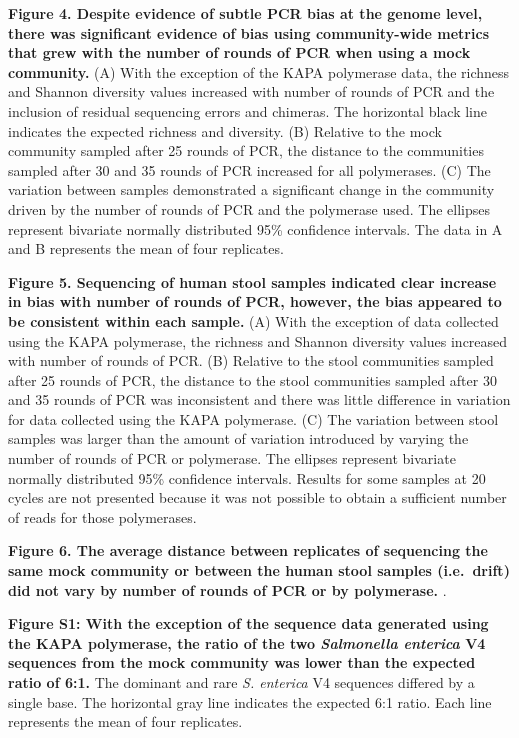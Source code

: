 \documentclass[11pt,]{article}
\begin{document}
\textbf{Figure 4. Despite evidence of subtle PCR bias at the genome
level, there was significant evidence of bias using community-wide
metrics that grew with the number of rounds of PCR when using a mock
community.} (A) With the exception of the KAPA polymerase data, the
richness and Shannon diversity values increased with number of rounds of
PCR and the inclusion of residual sequencing errors and chimeras. The
horizontal black line indicates the expected richness and diversity. (B)
Relative to the mock community sampled after 25 rounds of PCR, the
distance to the communities sampled after 30 and 35 rounds of PCR
increased for all polymerases. (C) The variation between samples
demonstrated a significant change in the community driven by the number
of rounds of PCR and the polymerase used. The ellipses represent
bivariate normally distributed 95\% confidence intervals. The data in A
and B represents the mean of four replicates.

\textbf{Figure 5. Sequencing of human stool samples indicated clear
increase in bias with number of rounds of PCR, however, the bias
appeared to be consistent within each sample.} (A) With the exception of
data collected using the KAPA polymerase, the richness and Shannon
diversity values increased with number of rounds of PCR. (B) Relative to
the stool communities sampled after 25 rounds of PCR, the distance to
the stool communities sampled after 30 and 35 rounds of PCR was
inconsistent and there was little difference in variation for data
collected using the KAPA polymerase. (C) The variation between stool
samples was larger than the amount of variation introduced by varying
the number of rounds of PCR or polymerase. The ellipses represent
bivariate normally distributed 95\% confidence intervals. Results for
some samples at 20 cycles are not presented because it was not possible
to obtain a sufficient number of reads for those polymerases.

\textbf{Figure 6. The average distance between replicates of sequencing
the same mock community or between the human stool samples (i.e.~drift)
did not vary by number of rounds of PCR or by polymerase.} .

\textbf{Figure S1: With the exception of the sequence data generated
using the KAPA polymerase, the ratio of the two \emph{Salmonella
enterica} V4 sequences from the mock community was lower than the
expected ratio of 6:1.} The dominant and rare \emph{S. enterica} V4
sequences differed by a single base. The horizontal gray line indicates
the expected 6:1 ratio. Each line represents the mean of four
replicates.
\end{document}
